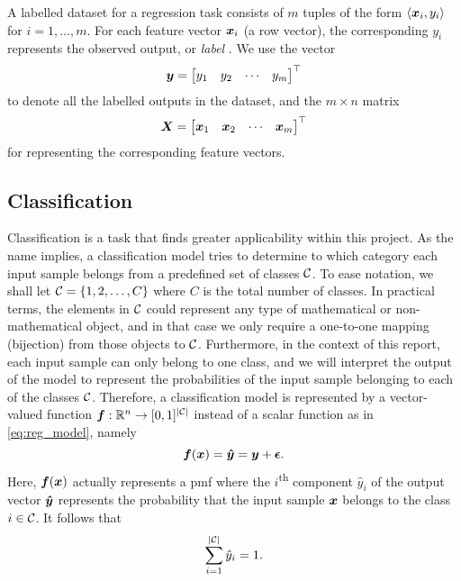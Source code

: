 \documentclass[../report.tex]{subfiles}
\begin{document}
A labelled dataset for a regression task consists of $m$ tuples of the form
$\langle {\bm{x}}_i, y_i\rangle$
for $i=1,\dots,m$.
For each feature vector ${\bm{x}}_i$ (a row vector), the corresponding $y_i$ represents the observed output, or \emph{label} \cite{burkov2019}.
We use the vector
\begin{equation}
    \label{eq:sup_learn_target}
    {\bm{y}} = \begin{bmatrix}
        y_1 & y_2 & \cdots & y_m
    \end{bmatrix}^\top
\end{equation}
to denote all the labelled outputs in the dataset, and the $m \times n$ matrix
\begin{equation}
    \label{eq:sup_learn_input_matrix}
    {\bm{X}} = \begin{bmatrix}
        {\bm{x}}_1 & {\bm{x}}_2 & \cdots & {\bm{x}}_m
    \end{bmatrix}^\top
\end{equation}
for representing the corresponding feature vectors.

\subsection{Classification}
\label{sec:background_classification}
Classification is a task that finds greater applicability within this project.
As the name implies, a classification model tries to determine to which category each input sample belongs from a predefined set of classes ${\mathcal{C}}$.
To ease notation, we shall let ${\mathcal{C}}=\{1, 2, \dots, C\}$ where $C$ is the total number of classes.
In practical terms, the elements in ${\mathcal{C}}$ could represent any type of mathematical or non-mathematical object, and in that case we only require a one-to-one mapping (bijection) from those objects to ${\mathcal{C}}$.
Furthermore, in the context of this report, each input sample can only belong to one class, and we will interpret the output of the model to represent the probabilities of the input sample belonging to each of the classes ${\mathcal{C}}$.
Therefore, a classification model is represented by a vector-valued function
${\bm{f}} : \mathbb{R}^n \rightarrow [0,1]^{\lvert{\mathcal{C}}\rvert}$
instead of a scalar function as in \cref{eq:reg_model}, namely
\begin{equation}
    \label{eq:cla_model}
    {\bm{f}}({\bm{x}}) = {\bm{\hat{y}}} = {\bm{y}} + \bm{\epsilon}.
\end{equation}
Here, ${\bm{f}}({\bm{x}})$ actually represents a \gls{pmf} where the $i$\textsuperscript{th} component $\hat{y}_i$ of the output vector ${\bm{\hat{y}}}$ represents the probability that the input sample ${\bm{x}}$ belongs to the class $i\in {\mathcal{C}}$.
It follows that
\begin{equation}
    \label{eq:pmf}
    \sum_{i=1}^{\lvert{\mathcal{C}}\rvert} \hat{y}_i = 1.
\end{equation}
\end{document}
